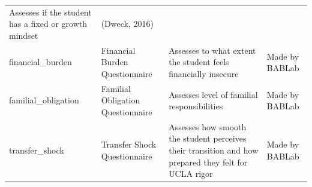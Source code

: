 \documentclass[]{book}
\begin{document}
\begin{longtable}[]{@{}llll@{}}
\begin{minipage}[t]{0.22\columnwidth}
Assesses if the student has a fixed or growth mindset\strut
\end{minipage} & \begin{minipage}[t]{0.18\columnwidth}\raggedright
(Dweck, 2016)\strut
\end{minipage}\tabularnewline
\begin{minipage}[t]{0.22\columnwidth}\raggedright
financial\_burden\strut
\end{minipage} & \begin{minipage}[t]{0.27\columnwidth}\raggedright
Financial Burden Questionnaire\strut
\end{minipage} & \begin{minipage}[t]{0.22\columnwidth}\raggedright
Assesses to what extent the student feels financially insecure\strut
\end{minipage} & \begin{minipage}[t]{0.18\columnwidth}\raggedright
Made by BABLab\strut
\end{minipage}\tabularnewline
\begin{minipage}[t]{0.22\columnwidth}\raggedright
familial\_obligation\strut
\end{minipage} & \begin{minipage}[t]{0.27\columnwidth}\raggedright
Familial Obligation Questionnaire\strut
\end{minipage} & \begin{minipage}[t]{0.22\columnwidth}\raggedright
Assesses level of familial responsibilities\strut
\end{minipage} & \begin{minipage}[t]{0.18\columnwidth}\raggedright
Made by BABLab\strut
\end{minipage}\tabularnewline
\begin{minipage}[t]{0.22\columnwidth}\raggedright
transfer\_shock\strut
\end{minipage} & \begin{minipage}[t]{0.27\columnwidth}\raggedright
Transfer Shock Questionnaire\strut
\end{minipage} & \begin{minipage}[t]{0.22\columnwidth}\raggedright
Assesses how smooth the student perceives their transition and how prepared they felt for UCLA rigor\strut
\end{minipage} & \begin{minipage}[t]{0.18\columnwidth}\raggedright
Made by BABLab\strut
\end{minipage}\tabularnewline
\bottomrule
\end{longtable}
\end{document}
